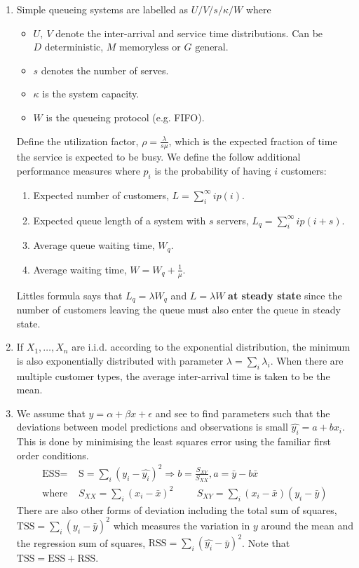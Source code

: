 \documentclass[a4paper]{article}
\newcommand{\ix}[1]{%
  \leavevmode %
  \marginpar{\small\emph{#1}}%
}
\begin{document}
\begin{enumerate}
\item\ix{Queueing Notation}Simple queueing systems are labelled as $U/V/s/\kappa/W$ where
\begin{itemize}
	\item $U,\ V$ denote the inter-arrival and service time distributions. Can be $D \text{ deterministic}$, $M \text{ memoryless}$ or $G \text{ general}$.
	\item $s$ denotes the number of serves.
	\item  $\kappa$ is the system capacity.
	\item $W$ is the queueing protocol (e.g. FIFO). 
\end{itemize}
Define the utilization factor, $\rho = \frac{\lambda}{s \mu}$, which is the expected fraction of time the service is expected to be busy. We define the follow additional performance measures where $p_i$ is the probability of having $i$ customers:
\begin{enumerate}
	\item Expected number of customers, $L = \sum_i^\infty ip(i)$.
	\item Expected queue length of a system with $s$ servers, $L_q = \sum_i^\infty ip(i+s)$.
	\item Average queue waiting time, $W_q$.
	\item Average waiting time, $W = W_q + \frac{1}{\mu}$.
\end{enumerate}
Littles formula says that $L_q = \lambda W_q$ and  $L=\lambda W$ \textbf{at steady state} since the number of customers leaving the queue must also enter the queue in steady state. 

\item If $X_1, \ldots, X_n$ are i.i.d. according to the exponential distribution, the minimum is also exponentially distributed with parameter $\lambda = \sum_i \lambda_i$. When there are multiple customer types, the average inter-arrival time is taken to be the mean. 

\item\ix{Regression}We assume that $y = \alpha + \beta x + \epsilon$ and see to find parameters such that the deviations between model predictions and observations is small $\hat{y_i} = a + bx_i$. This is done by minimising the least squares error using the familiar first order conditions.
\begin{align*}
\text{ESS} = &\text{S} = \sum_i (y_i - \hat{y_i})^2  \Rightarrow b = \frac{S_{XY}}{S_{XX}} , a = \bar{y} - b \bar{x} \\
\text{where } &S_{XX}= \sum_i (x_i - \bar{x})^2 \hspace{1cm} S_{XY}=\sum_i (x_i - \bar{x})(y_i - \bar{y})
\end{align*}
There are also other forms of deviation including the total sum of squares, $\text{TSS} = \sum_i (y_i - \bar{y})^2$ which measures the variation in $y$ around the mean and the regression sum of squares, $\text{RSS} = \sum_i (\hat{y_i} - \bar{y})^2$. Note that $\text{TSS} = \text{ESS} + \text{RSS}$.


\end{enumerate}
\end{document}

